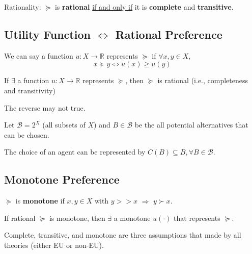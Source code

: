 \documentclass[11pt]{elegantbook}
\begin{document}
\begin{definition}
    \normalfont
    {Rationality}: $\succeq$ is \textbf{rational} \underline{if and only if} it is \textbf{complete} and \textbf{transitive}.
\end{definition}

\subsection{Utility Function $\Leftrightarrow$ Rational Preference}
\begin{definition}
    \normalfont
    We can say a function $u: X \rightarrow \mathbb{R}$ represents $\succeq$ if $\forall x,y\in X$, $$x\succeq y \Leftrightarrow u(x)\geq u(y)$$
\end{definition}

\begin{proposition}
    If $\exists$ a function $u: X \rightarrow \mathbb{R}$ represents $\succeq$, then $\succeq$ is rational (i.e., completeness and transitivity)
\end{proposition}
\begin{note}
    The reverse may not true.
\end{note}

Let $\mathcal{B}=2^X$ (all subsets of $X$) and $B\in \mathcal{B}$ be the all potential alternatives that can be chosen.

The choice of an agent can be represented by $C(B)\subseteq B, \forall B\in \mathcal{B}$.


\subsection{Monotone Preference}
\begin{definition}
    \normalfont
    $\succeq$ is \textbf{monotone} if $x,y\in X$ with $y>>x$ $\Rightarrow$ $y\succ x$.
\end{definition}

\begin{proposition}
    If rational $\succeq$ is monotone, then $\exists$ a monotone $u(\cdot)$ that represents $\succeq$.
\end{proposition}

\begin{note}
    Complete, transitive, and monotone are three assumptions that made by all theories (either EU or non-EU).
\end{note}
\end{document}
